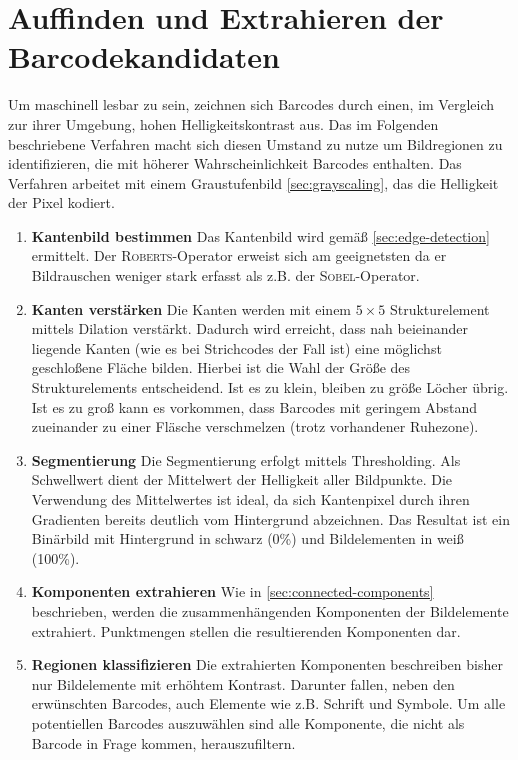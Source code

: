 \section{Auffinden und Extrahieren der Barcodekandidaten}
\writtenby{\dcauthornameewie}%
Um maschinell lesbar zu sein, zeichnen sich Barcodes durch einen, im Vergleich zur ihrer Umgebung, hohen Helligkeitskontrast aus.
Das im Folgenden beschriebene Verfahren macht sich diesen Umstand zu nutze um Bildregionen zu identifizieren, die mit höherer Wahrscheinlichkeit Barcodes enthalten.
Das Verfahren arbeitet mit einem Graustufenbild \autoref{sec:grayscaling}, das die Helligkeit der Pixel kodiert.

\begin{enumerate}[(1)]
\item \textbf{Kantenbild bestimmen}
Das Kantenbild wird gemäß \autoref{sec:edge-detection} ermittelt.
Der \textsc{Roberts}-Operator erweist sich am geeignetsten da er Bildrauschen weniger stark erfasst als z.B. der \textsc{Sobel}-Operator.

\item \textbf{Kanten verstärken}
Die Kanten werden mit einem $5\times5$ Strukturelement mittels Dilation verstärkt.
Dadurch wird erreicht, dass nah beieinander liegende Kanten (wie es bei Strichcodes der Fall ist) eine möglichst geschloßene Fläche bilden.
Hierbei ist die Wahl der Größe des Strukturelements entscheidend.
Ist es zu klein, bleiben zu größe Löcher übrig.
Ist es zu groß kann es vorkommen, dass Barcodes mit geringem Abstand zueinander zu einer Fläsche verschmelzen (trotz vorhandener Ruhezone).

\item \textbf{Segmentierung}
Die Segmentierung erfolgt mittels Thresholding.
Als Schwellwert dient der Mittelwert der Helligkeit aller Bildpunkte.
Die Verwendung des Mittelwertes ist ideal, da sich Kantenpixel durch ihren Gradienten bereits deutlich vom Hintergrund abzeichnen.
Das Resultat ist ein Binärbild mit Hintergrund in schwarz (0\%) und Bildelementen in weiß (100\%).

\item \textbf{Komponenten extrahieren}
Wie in \autoref{sec:connected-components} beschrieben, werden die zusammenhängenden Komponenten der Bildelemente extrahiert.
Punktmengen stellen die resultierenden Komponenten dar.

\item \textbf{Regionen klassifizieren}
Die extrahierten Komponenten beschreiben bisher nur Bildelemente mit erhöhtem Kontrast.
Darunter fallen, neben den erwünschten Barcodes, auch Elemente wie z.B. Schrift und Symbole.
Um alle potentiellen Barcodes auszuwählen sind alle Komponente, die nicht als Barcode in Frage kommen, herauszufiltern.


\end{enumerate}

